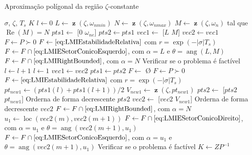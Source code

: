 \documentclass[aspectratio=169,11pt,t,xcolor={usenames,dvipsnames,x11names}]{beamer}
\DeclareMathOperator{\real}{Re}
\DeclareMathOperator{\angulo}{ang}
\DeclareMathOperator{\loc}{loc}
\DeclareMathOperator{\z}{\textbf{z}}
\begin{document}
\begin{frame}[c, allowframebreaks]{Aproximação polígonal da região $\zeta$-constante}
	  \begin{algorithmic}[1]
	    \Require $\sigma$, $\zeta$, $T_s$
	    \Ensure $K$
	    \State $l \gets 0$
	    \State $L \gets \z(\zeta,\omega_{nmin})$
	    \State $N \gets \z(\zeta,\omega_{nmax})$
	    \State $M \gets \z(\zeta,\omega_n)$ tal que $\real{(M)} = N$
	    \State $pts1 \gets$ [$0$ $\omega_{ne}$]
	    \State $pts2 \gets pts1$
	    \State $vec1 \gets$ [$L$ $M$]
	    \State $vec2 \gets vec1$
	    \State $F \gets P \succ 0$
	    \State $F \gets \eqref{eq:LMIEstabilidadeRelativa}$ com $r = \exp{\left(-|\sigma|T_s\right)}$ 
	    \State $F \gets F \cap \eqref{eq:LMIESetorConicoEsquerdo}$, com $\alpha = L$ e $\theta = \angulo(L,M)$ 
	    \State $F \gets F \cap \eqref{eq:LMIRightBounded}$, com $\alpha = N$ 
	    \State Verificar se o problema é factível
	        \State $l \gets l + 1$
	      \Else
	        \State $l \gets 1$
	        \State $vec1 \gets vec2$
	        \State $pts1 \gets pts2$
	      \EndIf
	        \State $F \gets$ \O {}
	        \State $F \gets P \succ 0$
	        \State $F \gets \eqref{eq:LMIEstabilidadeRelativa}$ com $r = \exp{\left(-|\sigma|T_s\right)}$ 
	        \State $pt_{new1} \gets (pts1(l)+pts1(l+1))/2$
	        \State $V_{new1} \gets \z(\zeta, pt_{new1})$
	        \State $pts2 \gets$ [$pts2$ $pt_{new1}$]
	        \State Orderna de forma decrescente $pts2$
	        \State $vec2 \gets$ [$vec2$ $V_{new1}$]
	        \State Orderna de forma decrescente $vec2$
	        \State $F \gets F \cap \eqref{eq:LMIRightBounded}$, com $\alpha = N$ 
	          \State $u_1 \gets \loc(vec2(m),vec2(m+1))$
	            \State $F\gets F \cap \eqref{eq:LMIESetorConicoDireito}$, com $\alpha = u_1$ e $\theta = \angulo(vec2(m+1),u_1)$ 
	          \Else
	            \State $F\gets F \cap \eqref{eq:LMIESetorConicoEsquerdo}$, com $\alpha = u_1$ e $\theta = \angulo(vec2(m+1),u_1)$ 
	          \EndIf
	        \EndFor
	        \State Verificar se o problema é factível 
	    \EndWhile
	    \State $K \gets ZP^{-1}$
	  \end{algorithmic}
\end{frame}
\end{document}
